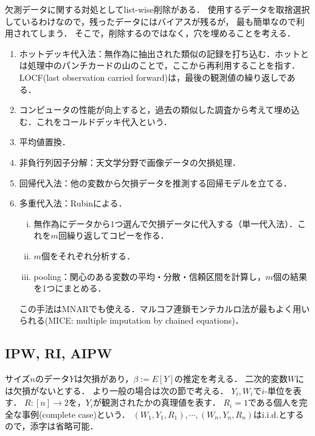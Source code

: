 \documentclass[uplatex,dvipdfmx]{jsreport}
\begin{document}
\begin{remark}[代入法とは？]
    欠測データに関する対処としてlist-wise削除がある．
    使用するデータを取捨選択しているわけなので，残ったデータにはバイアスが残るが，
    最も簡単なので利用されてしまう．
    そこで，削除するのではなく，穴を埋めることを考える．
    \begin{enumerate}
        \item ホットデッキ代入法：無作為に抽出された類似の記録を打ち込む．ホットとは処理中のパンチカードの山のことで，ここから再利用することを指す．
        LOCF(last observation carried forward)は，最後の観測値の繰り返しである．
        \item コンピュータの性能が向上すると，過去の類似した調査から考えて埋め込む．これをコールドデッキ代入という．
        \item 平均値置換．
        \item 非負行列因子分解：天文学分野で画像データの欠損処理．
        \item 回帰代入法：他の変数から欠損データを推測する回帰モデルを立てる．
        \item 多重代入法：Rubinによる．
        \begin{enumerate}[i.]
            \item 無作為にデータから1つ選んで欠損データに代入する（単一代入法）．これを$m$回繰り返してコピーを作る．
            \item $m$個をそれぞれ分析する．
            \item pooling：関心のある変数の平均・分散・信頼区間を計算し，$m$個の結果を1つにまとめる．
        \end{enumerate}
        この手法はMNARでも使える．マルコフ連鎖モンテカルロ法が最もよく用いられる(MICE: multiple imputation by chained equations)．
    \end{enumerate}
\end{remark}

\subsection{IPW, RI, AIPW}

\begin{notation}
    サイズ$n$のデータ$Y$は欠損があり，$\beta:=E[Y]$の推定を考える．
    二次的変数$W$には欠損がないとする．
    より一般の場合は次の節で考える．
    $Y_i,W_i$で$i$-単位を表す．
    $R:[n]\to2$を，$Y_i$が観測されたかの真理値を表す．
    $R_i=1$である個人を完全な事例(complete case)という．
    $(W_1,Y_1,R_1),\cdots,(W_n,Y_n,R_n)$はi.i.d.とするので，添字は省略可能．
\end{notation}
\end{document}
